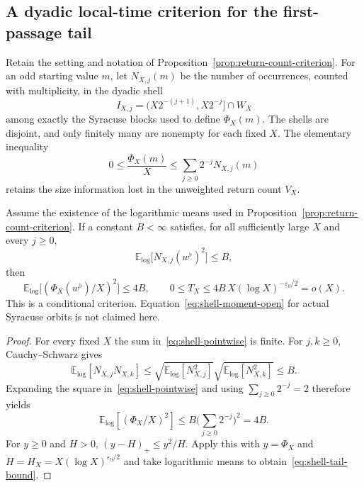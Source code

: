 \subsection*{A dyadic local-time criterion for the first-passage tail}
\label{subsec:shell-local-time}
Retain the setting and notation of Proposition~\ref{prop:return-count-criterion}.
For an odd starting value $m$, let $N_{X,j}(m)$ be the number of occurrences,
counted with multiplicity, in the dyadic shell
\[
 I_{X,j}=\bigl(X2^{-(j+1)},X2^{-j}\bigr]\cap W_X
\]
among exactly the Syracuse blocks used to define $\Phi_X(m)$. The shells
are disjoint, and only finitely many are nonempty for each fixed $X$.
The elementary inequality
\begin{equation}\label{eq:shell-pointwise}
 0\le\frac{\Phi_X(m)}X\le
 \sum_{j\ge0}2^{-j}N_{X,j}(m)
\end{equation}
retains the size information lost in the unweighted return count $V_X$.

\begin{proposition}
\label{prop:shell-moment-criterion}
Assume the existence of the logarithmic means used in
Proposition~\ref{prop:return-count-criterion}. If a constant $B<\infty$
satisfies, for all sufficiently large $X$ and every $j\ge0$,
\begin{equation}\label{eq:shell-moment-open}
 \mathbb E_{\log}\bigl[N_{X,j}(w^\flat)^2\bigr]\le B,
\end{equation}
then
\begin{equation}\label{eq:shell-tail-bound}
 \mathbb E_{\log}\bigl[(\Phi_X(w^\flat)/X)^2\bigr]\le4B,
 \qquad
 0\le T_X\le 4B\,X(\log X)^{-\varepsilon_0/2}=o(X).
\end{equation}
This is a conditional criterion. Equation~\eqref{eq:shell-moment-open}
for actual Syracuse orbits is not claimed here.
\end{proposition}
\begin{proof}
For every fixed $X$ the sum in~\eqref{eq:shell-pointwise} is finite.
For $j,k\ge0$, Cauchy--Schwarz gives
\[
 \mathbb E_{\log}[N_{X,j}N_{X,k}]
 \le \sqrt{\mathbb E_{\log}[N_{X,j}^2]}
      \sqrt{\mathbb E_{\log}[N_{X,k}^2]}\le B.
\]
Expanding the square in~\eqref{eq:shell-pointwise} and using
$\sum_{j\ge0}2^{-j}=2$ therefore yields
\[
 \mathbb E_{\log}\left[(\Phi_X/X)^2\right]
 \le B\bigl(\sum_{j\ge0}2^{-j}\bigr)^2=4B.
\]
For $y\ge0$ and $H>0$, $(y-H)_+\le y^2/H$. Apply this with
$y=\Phi_X$ and $H=H_X=X(\log X)^{\varepsilon_0/2}$ and take
logarithmic means to obtain~\eqref{eq:shell-tail-bound}.
\end{proof}

